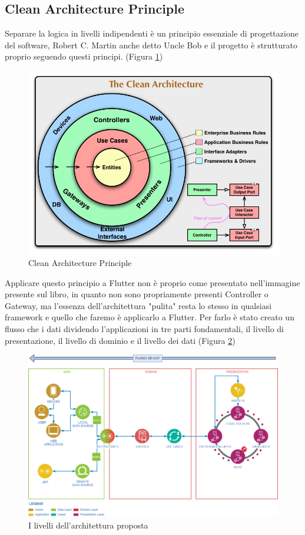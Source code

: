 \subsection{Clean Architecture Principle}\label{paragraph:cleanArchitecture}
Separare la logica in livelli indipendenti è un principio essenziale di progettazione del software, Robert C. Martin anche detto Uncle Bob\cite{10.5555/3175742} e il progetto è strutturato proprio seguendo questi principi. (Figura \ref{fig:cap})
\begin{figure}[h]
    \centering
    \includegraphics[scale=.55]{immagini/cleanarchitecture.png}
    \caption{Clean Architecture Principle}
    \label{fig:cap}
\end{figure}
Applicare questo principio a Flutter non è proprio come presentato nell'immagine presente sul libro, in quanto non sono propriamente presenti Controller o Gateway, ma l'essenza dell'architettura "pulita" resta lo stesso in qualsiasi framework e quello che faremo è applicarlo a Flutter. Per farlo è stato creato un flusso che i dati dividendo l'applicazioni in tre parti fondamentali, il livello di presentazione, il livello di dominio e il livello dei dati (Figura \ref{fig:architecture})
\begin{figure}
    \centering
    \includegraphics[scale=.42]{immagini/architecture.png}
    \caption{I livelli dell'architettura proposta}
    \label{fig:architecture}
\end{figure}
